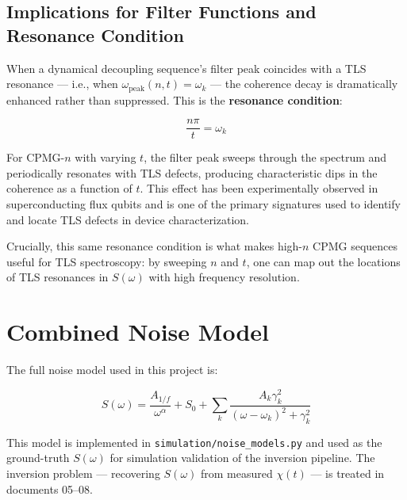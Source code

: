 \documentclass[10pt]{article}
\begin{document}
\subsection{Implications for Filter Functions and Resonance Condition}

When a dynamical decoupling sequence's filter peak coincides with a TLS resonance — i.e., when $\omega_\text{peak}(n, t) = \omega_k$ — the coherence decay is dramatically enhanced rather than suppressed. This is the \textbf{resonance condition}:

\begin{equation}
    \frac{n\pi}{t} = \omega_k
\end{equation}

For CPMG-$n$ with varying $t$, the filter peak sweeps through the spectrum and periodically resonates with TLS defects, producing characteristic dips in the coherence as a function of $t$. This effect has been experimentally observed in superconducting flux qubits \cite{Bylander2011} and is one of the primary signatures used to identify and locate TLS defects in device characterization.

Crucially, this same resonance condition is what makes high-$n$ CPMG sequences useful for TLS spectroscopy: by sweeping $n$ and $t$, one can map out the locations of TLS resonances in $S(\omega)$ with high frequency resolution.

\section{Combined Noise Model}

The full noise model used in this project is:

\begin{equation}
    S(\omega) = \frac{A_{1/f}}{\omega^\alpha} + S_0 + \sum_k \frac{A_k \gamma_k^2}{(\omega - \omega_k)^2 + \gamma_k^2}
\end{equation}

This model is implemented in \texttt{simulation/noise\_models.py} and used as the ground-truth $S(\omega)$ for simulation validation of the inversion pipeline. The inversion problem — recovering $S(\omega)$ from measured $\chi(t)$ — is treated in documents 05--08.
\end{document}
